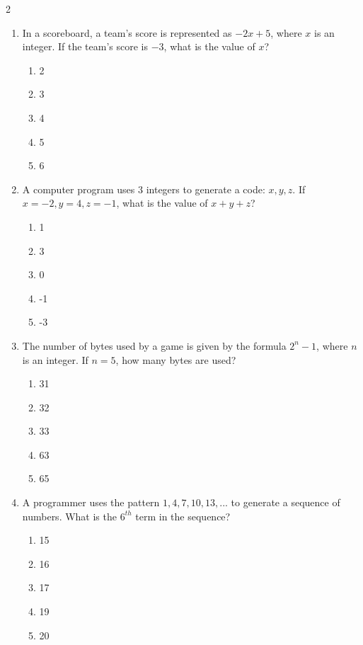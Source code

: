 \documentclass[10pt]{article}
\begin{document}
\begin{multicols}{2}
\begin{enumerate}[label=\textbf{Q\arabic*.}, leftmargin=*, itemsep=6pt, parsep=0pt]
  \item \small In a scoreboard, a team's score is represented as $-2x + 5$, where $x$ is an integer. If the team's score is $-3$, what is the value of $x$?
  \begin{enumerate}[label=(\Alph*), leftmargin=0.6cm, nosep, itemsep=2pt]
    \item 2
    \item 3
    \item 4
    \item 5
    \item 6
  \end{enumerate}

  \item \small A computer program uses $3$ integers to generate a code: $x, y, z$. If $x = -2, y = 4, z = -1$, what is the value of $x + y + z$?
  \begin{enumerate}[label=(\Alph*), leftmargin=0.6cm, nosep, itemsep=2pt]
    \item 1
    \item 3
    \item 0
    \item -1
    \item -3
  \end{enumerate}

  \item \small The number of bytes used by a game is given by the formula $2^n - 1$, where $n$ is an integer. If $n = 5$, how many bytes are used?
  \begin{enumerate}[label=(\Alph*), leftmargin=0.6cm, nosep, itemsep=2pt]
    \item 31
    \item 32
    \item 33
    \item 63
    \item 65
  \end{enumerate}

  \item \small A programmer uses the pattern $1, 4, 7, 10, 13, ...$ to generate a sequence of numbers. What is the $6^{th}$ term in the sequence?
  \begin{enumerate}[label=(\Alph*), leftmargin=0.6cm, nosep, itemsep=2pt]
    \item 15
    \item 16
    \item 17
    \item 19
    \item 20
  \end{enumerate}


\end{enumerate}
\end{multicols}
\end{document}
